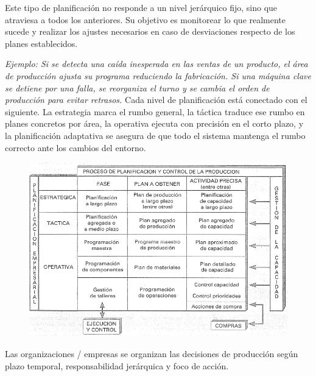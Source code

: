 \documentclass[a4paper,oneside,11pt]{article}
\begin{document}
Este tipo de planificación no responde a un nivel jerárquico fijo, sino que atraviesa a todos los anteriores. Su objetivo es monitorear lo que realmente sucede y realizar los ajustes necesarios en caso de desviaciones respecto de los planes establecidos.

\textit{Ejemplo: Si se detecta una caída inesperada en las ventas de un producto, el área de producción ajusta su programa reduciendo la fabricación. Si una máquina clave se detiene por una falla, se reorganiza el turno y se cambia el orden de producción para evitar retrasos.}
Cada nivel de planificación está conectado con el siguiente. La estrategia marca el rumbo general, la táctica traduce ese rumbo en planes concretos por área, la operativa ejecuta con precisión en el corto plazo, y la planificación adaptativa se asegura de que todo el sistema mantenga el rumbo correcto ante los cambios del entorno.


\begin{figure} [ht!]
    \centering
    \includegraphics[scale=0.7]{jerarquia.png}
\end{figure}


Las organizaciones / empresas se organizan las decisiones de producción según plazo temporal, responsabilidad jerárquica y foco de acción.
\end{document}

